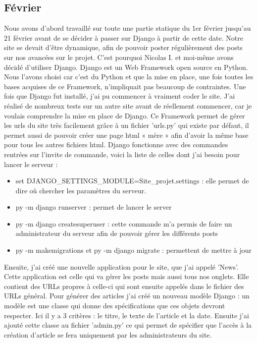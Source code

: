 \documentclass[]{extarticle}
\begin{document}
\begin{spacing}{1.25}
\subsection{Février}
\bigbreak
\bigbreak
Nous avons d’abord travaillé sur toute une partie statique du 1er février jusqu’au 21 février avant de se décider à passer sur Django à partir de cette date.
\bigbreak
Notre site se devait d’être dynamique, afin de pouvoir poster régulièrement des posts sur nos avancées sur le projet. C’est pourquoi Nicolas I. et moi-même avons décidé d’utiliser Django. Django est un Web Framework open source en Python. Nous l’avons choisi car c’est du Python et que la mise en place, une fois toutes les bases acquises de ce Framework, n’impliquait pas beaucoup de contraintes.
\bigbreak
Une fois que Django fut installé, j’ai pu commencer à vraiment coder le site. J’ai réalisé de nombreux tests sur un autre site avant de réellement commencer, car je voulais comprendre la mise en place de Django.
\newpage
 Ce Framework permet de gérer les urls du site très facilement grâce à un fichier 'urls.py' qui existe par défaut, il permet aussi de pouvoir créer une page html « mère » afin d’avoir la même base pour tous les autres fichiers html. Django fonctionne avec des commandes rentrées sur l'invite de commande, voici la liste de celles dont j’ai besoin pour lancer le serveur :
\bigbreak
\begin{itemize}
\item set DJANGO\_SETTINGS\_MODULE=Site\_projet.settings : elle permet de dire où chercher les paramètres du serveur.
\item py -m django runserver : permet de lancer le server
\item py -m django createsuperuser : cette commande m’a permis de faire un administrateur du serveur afin de pouvoir gérer les différents posts
\item py -m makemigrations et py -m django migrate : permettent de mettre à jour 
\end{itemize}
\bigbreak
\bigbreak
Ensuite, j’ai créé une nouvelle application pour le site, que j’ai appelé 'News'. Cette application est celle qui va gérer les posts mais aussi tous nos onglets. Elle contient des URLs propres à celle-ci qui sont ensuite appelés dans le fichier des URLs général.
\bigbreak
 Pour générer des articles j’ai créé un nouveau modèle Django : un modèle est une classe qui donne des spécifications que ces objets devront respecter. Ici il y a 3 critères : le titre, le texte de l’article et la date. Ensuite j’ai ajouté cette classe au fichier 'admin.py' ce qui permet de spécifier que l’accès à la création d’article se fera uniquement par les administrateurs du site.

\end{spacing}
\end{document}
